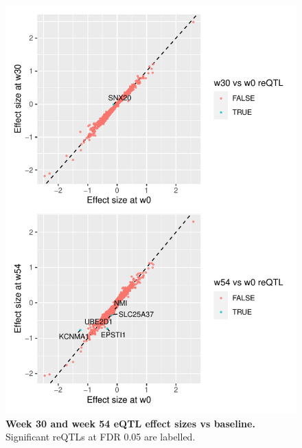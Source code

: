 \begin{figure}
    \centering
    \includegraphics[width=1.0\textwidth,page=1]{mainmatter/figures/chapter_04/plot_dge_eqtl.pm_w30_vs_w0_and_w54_vs_w0}
    \caption{
        \textbf{Week 30 and week 54 eQTL effect sizes vs baseline.}
        Significant reQTLs at FDR 0.05 are labelled.
    }
    \label{fig:multipants_reQTL_pm_w30_vs_w0_and_w54_vs_w0}
\end{figure}


